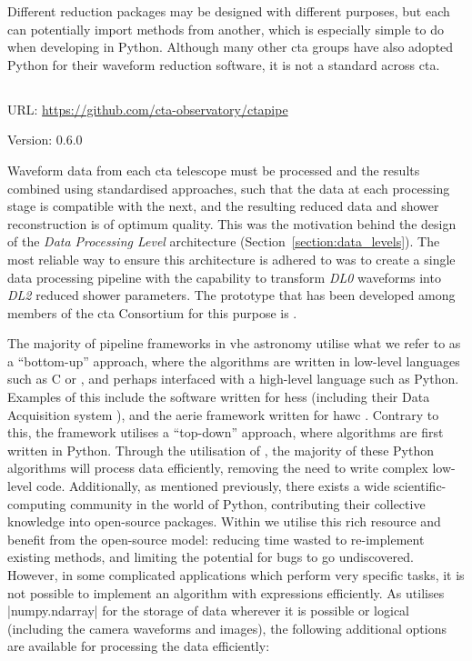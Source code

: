 Different reduction packages may be designed with different purposes, but each can potentially import methods from another, which is especially simple to do when developing in Python. Although many other \gls{cta} groups have also adopted Python for their waveform reduction software, it is not a standard across \gls{cta}.

\subsection{}
\vspace{-0.7em}
\noindent \hspace{\parindent} {\tiny URL: \url{https://github.com/cta-observatory/ctapipe} \par}
\noindent \hspace{\parindent} {\tiny Version: 0.6.0 \par}

\noindent Waveform data from each \gls{cta} telescope must be processed and the results combined using standardised approaches, such that the data at each processing stage is compatible with the next, and the resulting reduced data and shower reconstruction is of optimum quality. This was the motivation behind the design of the \textit{Data Processing Level} architecture (Section~\ref{section:data_levels}). The most reliable way to ensure this architecture is adhered to was to create a single data processing pipeline with the capability to transform \textit{DL0} waveforms into \textit{DL2} reduced shower parameters. The prototype that has been developed among members of the \gls{cta} Consortium for this purpose is .

The majority of pipeline frameworks in \gls{vhe} astronomy utilise what we refer to as a ``bottom-up'' approach, where the algorithms are written in low-level languages such as C or \cpp, and perhaps interfaced with a high-level language such as Python. Examples of this include the software written for \gls{hess} (including their Data Acquisition system \cite{Balzer2014}), and the \gls{aerie} framework written for \gls{hawc} \cite{Abeysekara2018}. Contrary to this, the  framework utilises a ``top-down'' approach, where algorithms are first written in Python. Through the utilisation of , the majority of these Python algorithms will process data efficiently, removing the need to write complex low-level code. Additionally, as mentioned previously, there exists a wide scientific-computing community in the world of Python, contributing their collective knowledge into open-source packages. Within  we utilise this rich resource and benefit from the open-source model: reducing time wasted to re-implement existing methods, and limiting the potential for bugs to go undiscovered. However, in some complicated applications which perform very specific tasks, it is not possible to implement an algorithm with  expressions efficiently. As  utilises |numpy.ndarray| for the storage of data wherever it is possible or logical (including the camera waveforms and images), the following additional options are available for processing the data efficiently:

